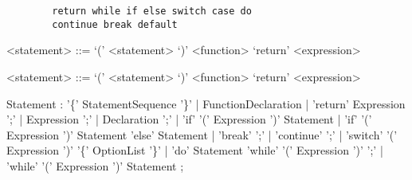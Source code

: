 \documentclass[a4paper, 11.5pt]{article}
\begin{document}
\begin{multicols}{2}
    \begin{center}
      \begin{tcolorbox}[breakable, blanker, width=0.8\linewidth]
        \begin{verbatim}
        return while if else switch case do 
        continue break default
        \end{verbatim}
      \end{tcolorbox}
    \end{center}

    \begin{grammar}
      <statement> ::= `(' <statement> `)'
                \alt <function>
                \alt `return' <expression>
    \end{grammar}
    \begin{grammar}
    <statement> ::= `(' <statement> `)'
                \alt <function>
                \alt `return' <expression>
    \end{grammar}

    \end{multicols}

    \begin{center}
        \begin{rail}
          Statement : '\{' StatementSequence '\}'
                    | FunctionDeclaration
                    | 'return' Expression ';'
                    | Expression ';'
                    | Declaration ';'
                    | 'if' '(' Expression ')' Statement
                    | 'if' '(' Expression ')' Statement 'else' Statement
                    | 'break' ';'
                    | 'continue' ';'
                    | 'switch' '(' Expression ')' '\{' OptionList '\}'
                    | 'do' Statement 'while' '(' Expression ')' ';'
                    | 'while' '(' Expression ')' Statement
                    ;      
        \end{rail}
    \end{center}
      
\end{document}
